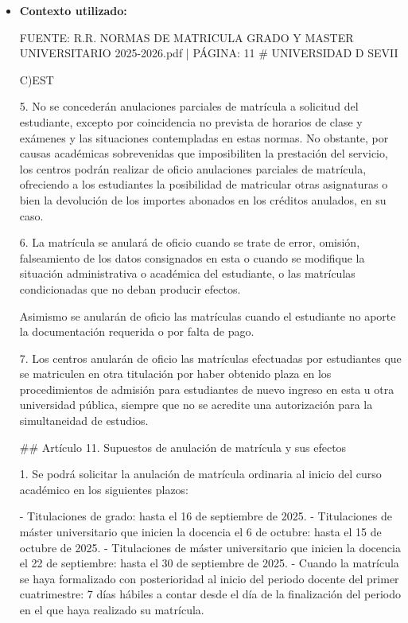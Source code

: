 \documentclass{article}
\begin{document}
\begin{itemize}
\begin{itemize}
                Recuerda que la anulación de matrícula puede tener consecuencias académicas y económicas, por lo que es importante leer detenidamente las Normas de Matrícula Grado y Máster Universitario 2025-2026 y consultar con la Universidad de Sevilla si tienes alguna duda.
          \item \textbf{Contexto utilizado:}
                \begin{scriptsize}
                  FUENTE: R.R. NORMAS DE MATRICULA GRADO Y MASTER UNIVERSITARIO 2025-2026.pdf | PÁGINA: 11
                  \# UNIVERSIDAD D SEVII

                  C)EST

                  5. No se concederán anulaciones parciales de matrícula a solicitud del estudiante, excepto por coincidencia no prevista de horarios de clase y exámenes y las situaciones contempladas en estas normas. No obstante, por causas académicas sobrevenidas que imposibiliten la prestación del servicio, los centros podrán realizar de oficio anulaciones parciales de matrícula, ofreciendo a los estudiantes la posibilidad de matricular otras asignaturas o bien la devolución de los importes abonados en los créditos anulados, en su caso.

                  6. La matrícula se anulará de oficio cuando se trate de error, omisión, falseamiento de los datos consignados en esta o cuando se modifique la situación administrativa o académica del estudiante, o las matrículas condicionadas que no deban producir efectos.

                  Asimismo se anularán de oficio las matrículas cuando el estudiante no aporte la documentación requerida o por falta de pago.

                  7. Los centros anularán de oficio las matrículas efectuadas por estudiantes que se matriculen en otra titulación por haber obtenido plaza en los procedimientos de admisión para estudiantes de nuevo ingreso en esta u otra universidad pública, siempre que no se acredite una autorización para la simultaneidad de estudios.

                  \#\# Artículo 11. Supuestos de anulación de matrícula y sus efectos

                  1. Se podrá solicitar la anulación de matrícula ordinaria al inicio del curso académico en los siguientes plazos:

                  - Titulaciones de grado: hasta el 16 de septiembre de 2025.
                  - Titulaciones de máster universitario que inicien la docencia el 6 de octubre: hasta el 15 de octubre de 2025.
                  - Titulaciones de máster universitario que inicien la docencia el 22 de septiembre: hasta el 30 de septiembre de 2025.
                  - Cuando la matrícula se haya formalizado con posterioridad al inicio del periodo docente del primer cuatrimestre: 7 días hábiles a contar desde el día de la finalización del periodo en el que haya realizado su matrícula.


\end{scriptsize}
\end{itemize}
\end{itemize}
\end{document}
